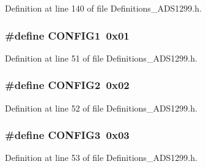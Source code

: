 Definition at line 140 of file Definitions\+\_\+\+A\+D\+S1299.\+h.

\subsubsection[{\texorpdfstring{C\+O\+N\+F\+I\+G1}{CONFIG1}}]{\setlength{\rightskip}{0pt plus 5cm}\#define C\+O\+N\+F\+I\+G1~0x01}\hypertarget{group__Definitions__ADS1299_gae28dbf424985dc1c58ae7dbc5a0926b9}{}\label{group__Definitions__ADS1299_gae28dbf424985dc1c58ae7dbc5a0926b9}


Definition at line 51 of file Definitions\+\_\+\+A\+D\+S1299.\+h.

\subsubsection[{\texorpdfstring{C\+O\+N\+F\+I\+G2}{CONFIG2}}]{\setlength{\rightskip}{0pt plus 5cm}\#define C\+O\+N\+F\+I\+G2~0x02}\hypertarget{group__Definitions__ADS1299_ga9989dac1034e36497f2f4f81613cab88}{}\label{group__Definitions__ADS1299_ga9989dac1034e36497f2f4f81613cab88}


Definition at line 52 of file Definitions\+\_\+\+A\+D\+S1299.\+h.

\subsubsection[{\texorpdfstring{C\+O\+N\+F\+I\+G3}{CONFIG3}}]{\setlength{\rightskip}{0pt plus 5cm}\#define C\+O\+N\+F\+I\+G3~0x03}\hypertarget{group__Definitions__ADS1299_ga8d128687074c874210b0c9dada3d8ca7}{}\label{group__Definitions__ADS1299_ga8d128687074c874210b0c9dada3d8ca7}


Definition at line 53 of file Definitions\+\_\+\+A\+D\+S1299.\+h.

